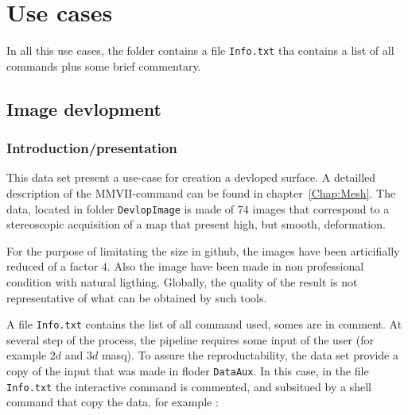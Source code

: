 

\chapter{Use cases}

In all this use cases, the folder contains a file {\tt Info.txt} tha contains a list of
all commands plus some brief commentary.


\section{Image devlopment}

\subsection{Introduction/presentation}

This data set present a use-case for creation a devloped surface.  A detailled
description of the MMVII-command can be found in chapter~\ref{Chap:Mesh}.
The data, located in folder {\tt DevlopImage}  is made of $74$ images that correspond to a stereoscopic
acquisition of a map that present high, but smooth, deformation.


For the purpose of limitating the size in github, the images have been articifially
reduced of a factor $4$. Also the image have been made in non professional
condition with natural ligthing. Globally, the quality of the result is
not representative of what can be obtained by such tools.

A file {\tt Info.txt} contains the list of all command used, somes are in
comment.
At several step of the process, the pipeline requires some input of the user
(for example $2d$ and $3d$ masq).  To assure the reproductability, the 
data set provide a copy of the input that was made in floder {\tt DataAux}. 
In this case, in the file {\tt Info.txt}  the interactive command is commented, and subsitued
by a shell command that copy the data, for example :

